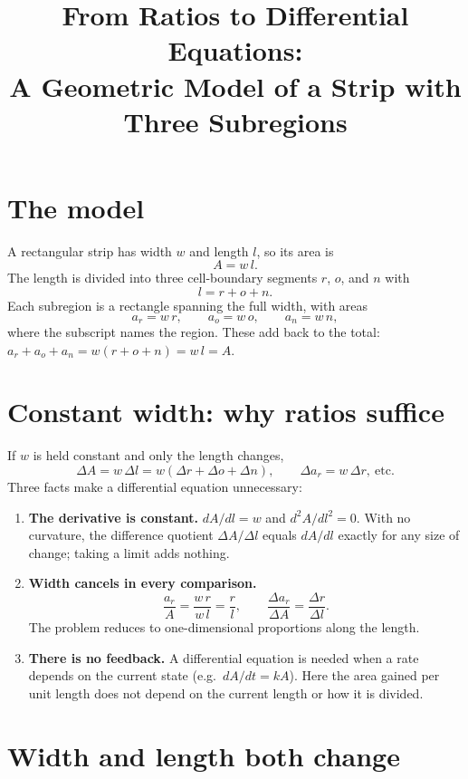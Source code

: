 \documentclass[11pt]{article}
\title{From Ratios to Differential Equations:\\ A Geometric Model of a Strip with Three Subregions}
\author{}
\date{}
\begin{document}
\maketitle

\section{The model}

A rectangular strip has width $w$ and length $l$, so its area is
\[
  A = w\,l .
\]
The length is divided into three cell-boundary segments $r$, $o$, and $n$ with
\[
  l = r + o + n .
\]
Each subregion is a rectangle spanning the full width, with areas
\[
  a_r = w\,r, \qquad a_o = w\,o, \qquad a_n = w\,n,
\]
where the subscript names the region. These add back to the total:
$a_r + a_o + a_n = w(r+o+n) = w\,l = A$.

\section{Constant width: why ratios suffice}

If $w$ is held constant and only the length changes,
\[
  \Delta A = w\,\Delta l = w(\Delta r + \Delta o + \Delta n),
  \qquad \Delta a_r = w\,\Delta r, \ \text{etc.}
\]
Three facts make a differential equation unnecessary:

\begin{enumerate}
  \item \textbf{The derivative is constant.} $dA/dl = w$ and $d^2A/dl^2 = 0$. With no curvature, the difference quotient $\Delta A/\Delta l$ equals $dA/dl$ exactly for any size of change; taking a limit adds nothing.
  \item \textbf{Width cancels in every comparison.}
  \[
    \frac{a_r}{A} = \frac{w\,r}{w\,l} = \frac{r}{l},
    \qquad
    \frac{\Delta a_r}{\Delta A} = \frac{\Delta r}{\Delta l}.
  \]
  The problem reduces to one-dimensional proportions along the length.
  \item \textbf{There is no feedback.} A differential equation is needed when a rate depends on the current state (e.g.\ $dA/dt = kA$). Here the area gained per unit length does not depend on the current length or how it is divided.
\end{enumerate}

\section{Width and length both change}
\end{document}
